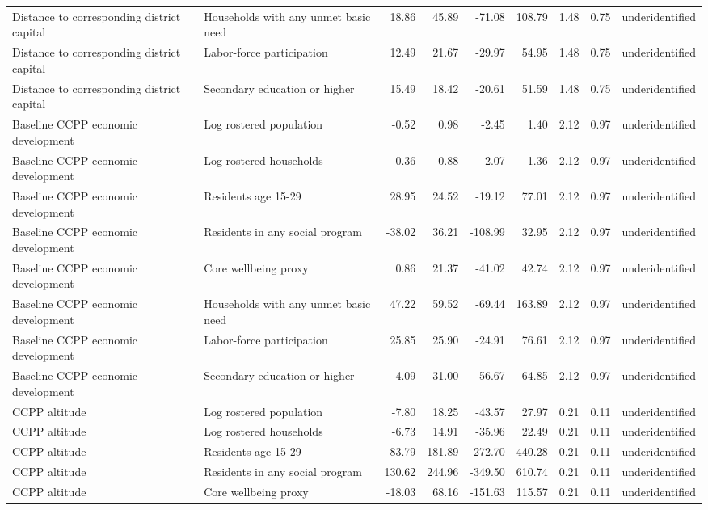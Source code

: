 \begin{table}[!htbp]
{\begin{tabular}{llrrrrrrl}
Distance to corresponding district capital & Households with any unmet basic need & 18.86 & 45.89 & -71.08 & 108.79 & 1.48 & 0.75 & underidentified \\
Distance to corresponding district capital & Labor-force participation & 12.49 & 21.67 & -29.97 & 54.95 & 1.48 & 0.75 & underidentified \\
Distance to corresponding district capital & Secondary education or higher & 15.49 & 18.42 & -20.61 & 51.59 & 1.48 & 0.75 & underidentified \\
Baseline CCPP economic development & Log rostered population & -0.52 & 0.98 & -2.45 & 1.40 & 2.12 & 0.97 & underidentified \\
Baseline CCPP economic development & Log rostered households & -0.36 & 0.88 & -2.07 & 1.36 & 2.12 & 0.97 & underidentified \\
Baseline CCPP economic development & Residents age 15-29 & 28.95 & 24.52 & -19.12 & 77.01 & 2.12 & 0.97 & underidentified \\
Baseline CCPP economic development & Residents in any social program & -38.02 & 36.21 & -108.99 & 32.95 & 2.12 & 0.97 & underidentified \\
Baseline CCPP economic development & Core wellbeing proxy & 0.86 & 21.37 & -41.02 & 42.74 & 2.12 & 0.97 & underidentified \\
Baseline CCPP economic development & Households with any unmet basic need & 47.22 & 59.52 & -69.44 & 163.89 & 2.12 & 0.97 & underidentified \\
Baseline CCPP economic development & Labor-force participation & 25.85 & 25.90 & -24.91 & 76.61 & 2.12 & 0.97 & underidentified \\
Baseline CCPP economic development & Secondary education or higher & 4.09 & 31.00 & -56.67 & 64.85 & 2.12 & 0.97 & underidentified \\
CCPP altitude & Log rostered population & -7.80 & 18.25 & -43.57 & 27.97 & 0.21 & 0.11 & underidentified \\
CCPP altitude & Log rostered households & -6.73 & 14.91 & -35.96 & 22.49 & 0.21 & 0.11 & underidentified \\
CCPP altitude & Residents age 15-29 & 83.79 & 181.89 & -272.70 & 440.28 & 0.21 & 0.11 & underidentified \\
CCPP altitude & Residents in any social program & 130.62 & 244.96 & -349.50 & 610.74 & 0.21 & 0.11 & underidentified \\
CCPP altitude & Core wellbeing proxy & -18.03 & 68.16 & -151.63 & 115.57 & 0.21 & 0.11 & underidentified \\

\end{tabular}}
\end{table}
